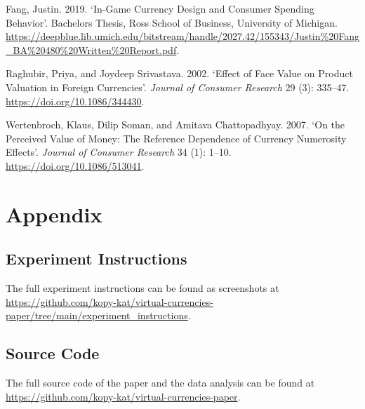 \documentclass[
]{report}
\newlength{\cslhangindent}
\newenvironment{CSLReferences}[2] %
 {\begin{list}{}{%
  \setlength{\itemindent}{0pt}
  \setlength{\leftmargin}{0pt}
  \setlength{\parsep}{0pt}
  \ifodd #1
   \setlength{\leftmargin}{\cslhangindent}
   \setlength{\itemindent}{-1\cslhangindent}
  \fi
  \setlength{\itemsep}{#2\baselineskip}}}
 {\end{list}}
\begin{document}
\label{refs}
\begin{CSLReferences}{1}{0}
Fang, Justin. 2019. {`In-Game Currency Design and Consumer Spending
Behavior'}. Bachelor\textquotesingle s Thesis, Ross School of Business,
University of Michigan.
\url{https://deepblue.lib.umich.edu/bitstream/handle/2027.42/155343/Justin\%20Fang_BA\%20480\%20Written\%20Report.pdf}.

Raghubir, Priya, and Joydeep Srivastava. 2002. {`{Effect of Face Value
on Product Valuation in Foreign Currencies}'}. \emph{Journal of Consumer
Research} 29 (3): 335--47. \url{https://doi.org/10.1086/344430}.

Wertenbroch, Klaus, Dilip Soman, and Amitava Chattopadhyay. 2007. {`{On
the Perceived Value of Money: The Reference Dependence of Currency
Numerosity Effects}'}. \emph{Journal of Consumer Research} 34 (1):
1--10. \url{https://doi.org/10.1086/513041}.

\end{CSLReferences}

\chapter{Appendix}\label{appendix}

\section{Experiment Instructions}\label{experiment-instructions}

The full experiment instructions can be found as screenshots at
\url{https://github.com/kopy-kat/virtual-currencies-paper/tree/main/experiment_instructions}.

\section{Source Code}\label{source-code}

The full source code of the paper and the data analysis can be found at
\url{https://github.com/kopy-kat/virtual-currencies-paper}.
\end{document}
